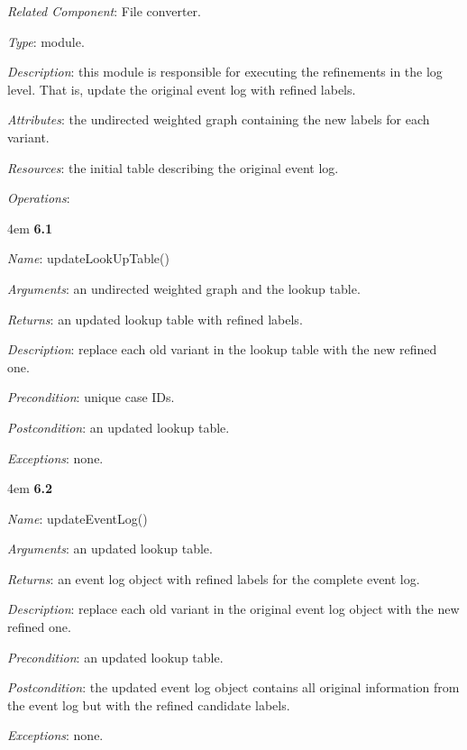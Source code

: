 \documentclass[notitlepage]{article}
\begin{document}
\begin{flushleft}
\textit{Related Component}: File converter.

\textit{Type}: module.

\textit{Description}: this module is responsible for executing the refinements in the log level. That is, update the original event log with refined labels.

\textit{Attributes}: the undirected weighted graph containing the new labels for each variant.

\textit{Resources}: the initial table describing the original event log.

\textit{Operations}: 
\medskip

\par
\begingroup
\leftskip4em
\textbf{6.1} 

\textit{Name}: updateLookUpTable()

\textit{Arguments}: an undirected weighted graph and the lookup table.

\textit{Returns}: an updated lookup table with refined labels.

\textit{Description}: replace each old variant in the lookup table with the new refined one.

\textit{Precondition}: unique case IDs.

\textit{Postcondition}: an updated lookup table.

\textit{Exceptions}: none.
\par
\endgroup


\medskip

\par
\begingroup
\leftskip4em
\textbf{6.2} 

\textit{Name}: updateEventLog() 

\textit{Arguments}: an updated lookup table.

\textit{Returns}: an event log object with refined labels for the complete event log.

\textit{Description}: replace each old variant in the original event log object with the new refined one.

\textit{Precondition}: an updated lookup table.

\textit{Postcondition}: the updated event log object contains all original information from the event log but with the refined candidate labels.

\textit{Exceptions}: none.
\par
\endgroup





\end{flushleft}
\end{document}
